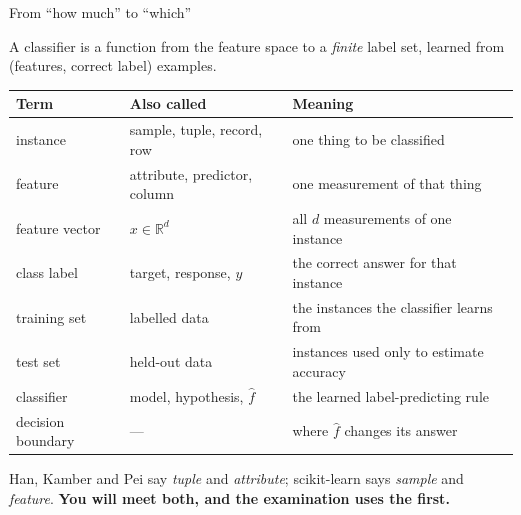 \documentclass[aspectratio=169]{beamer}
\begin{document}
\begin{frame}[shrink=6]{From ``how much'' to ``which''}
  \begin{exampleblock}{}
    \centering\large
    A classifier is a function from the feature space to a \emph{finite}
    label set, learned from (features, correct label) examples.
  \end{exampleblock}
  \vspace{0.2em}
  \begin{center}\small
  \begin{tabular}{@{}lll@{}}
    \toprule
    \textbf{Term} & \textbf{Also called} & \textbf{Meaning}\\
    \midrule
    instance & sample, tuple, record, row & one thing to be classified\\
    feature & attribute, predictor, column & one measurement of that thing\\
    feature vector & $x \in \mathbb{R}^{d}$ & all $d$ measurements of one
      instance\\
    class label & target, response, $y$ & the correct answer for that
      instance\\
    training set & labelled data & the instances the classifier learns from\\
    test set & held-out data & instances used only to estimate accuracy\\
    classifier & model, hypothesis, $\hat{f}$ & the learned label-predicting
      rule\\
    decision boundary & --- & where $\hat{f}$ changes its answer\\
    \bottomrule
  \end{tabular}
  \end{center}
  \begin{center}\small
    Han, Kamber and Pei say \emph{tuple} and \emph{attribute}; scikit-learn
    says \emph{sample} and \emph{feature}. \textbf{You will meet both, and
    the examination uses the first.}
  \end{center}
\end{frame}
\end{document}
